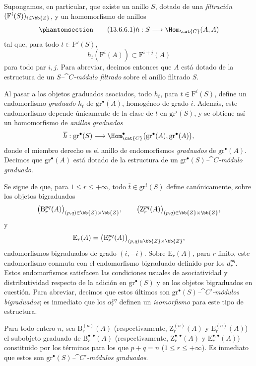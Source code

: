 \documentclass[oneside]{amsart}
\renewcommand{\leq}{\leqslant}
\newcommand{\oldpage}[2][]{{\marginnote{\normalfont\textbf{#1}~|~#2}}\ignorespaces}
\let\EGAOriginalLabel\label
\renewcommand{\label}[1]{\phantomsection\EGAOriginalLabel{#1}}
\begin{document}
\begin{env}[13.6.6]
\label{0.13.6.6}
Supongamos, en particular, que existe un anillo $S$, dotado de una
\emph{filtración} $(\mathrm{F}^i(S))_{i\in\bb{Z}}$, y un homomorfismo
de anillos
\begin{equation}
\label{0.13.6.6.1}
\tag{13.6.6.1}
  h:S\longrightarrow\Hom_{\cat{C}}(A,A)
\end{equation}
\oldpage[0\textsubscript{III}]{75}
tal que, para todo $t\in\mathrm{F}^j(S)$,
\[
  h_t(\mathrm F^i(A))
  \subset
  \mathrm{F}^{i+j}(A)
\]
para todo par $i,j$.
Para abreviar, decimos entonces que $A$ está dotado de la estructura de un
\emph{$S$--$\cat{C}$-módulo filtrado} sobre el anillo filtrado $S$.

Al pasar a los objetos graduados asociados, todo $h_t$, para
$t\in\mathrm{F}^i(S)$, define un endomorfismo \emph{graduado}
$\overline{h}_t$ de $\mathrm{gr}^\bullet(A)$, homogéneo de grado
$i$.
Además, este endomorfismo depende únicamente de la clase de $t$ en
$\mathrm{gr}^i(S)$, y se obtiene así un homomorfismo de
\emph{anillos graduados}
\[
  \overline{h}:
  \mathrm{gr}^\bullet(S)
  \longrightarrow
  \Hom_{\cat{C}}^\bullet
  \bigl(\mathrm{gr}^\bullet(A),\mathrm{gr}^\bullet(A)\bigr),
\]
donde el miembro derecho es el anillo de endomorfismos \emph{graduados} de
$\mathrm{gr}^\bullet(A)$.
Decimos que $\mathrm{gr}^\bullet(A)$ está dotado de la estructura
de un \emph{$\mathrm{gr}^\bullet(S)$--$\cat{C}$-módulo graduado}.

Se sigue de  que, para
$1\leq r\leq+\infty$, todo
$\overline{t}\in\mathrm{gr}^i(S)$ define canónicamente, sobre los
objetos bigraduados
\[
  \bigl(\mathrm{B}_r^{pq}(A)\bigr)_{(p,q)\in\bb{Z}\times\bb{Z}},
  \qquad
  \bigl(\mathrm{Z}_r^{pq}(A)\bigr)_{(p,q)\in\bb{Z}\times\bb{Z}},
\]
y
\[
  \mathrm{E}_r(A)
  =
  \bigl(\mathrm{E}_r^{pq}(A)\bigr)_{(p,q)\in\bb{Z}\times\bb{Z}},
\]
endomorfismos bigraduados de grado $(i,-i)$.
Sobre $\mathrm{E}_r(A)$, para $r$ finito, este endomorfismo conmuta con
el endomorfismo bigraduado definido por los $d_r^{pq}$.
Estos endomorfismos satisfacen las condiciones usuales de asociatividad y
distributividad respecto de la adición en
$\mathrm{gr}^\bullet(S)$ y en los objetos bigraduados en cuestión.
Para abreviar, decimos que estos últimos son
\emph{$\mathrm{gr}^\bullet(S)$--$\cat{C}'$-módulos bigraduados};
es inmediato que los $\alpha_r^{pq}$ definen un \emph{isomorfismo} para
este tipo de estructura.

Para todo entero $n$, sea $\mathrm{B}_r^{(n)}(A)$
(respectivamente, $\mathrm{Z}_r^{(n)}(A)$ y
$\mathrm{E}_r^{(n)}(A)$) el subobjeto graduado de
$\mathrm{B}_r^{\bullet,\bullet}(A)$
(respectivamente, $\mathrm{Z}_r^{\bullet,\bullet}(A)$ y
$\mathrm{E}_r^{\bullet,\bullet}(A)$) constituido por los términos para
los que $p+q=n$ ($1\leq r\leq+\infty$).
Es inmediato que estos son
\emph{$\mathrm{gr}^\bullet(S)$--$\cat{C}'$-módulos graduados}.


\end{env}
\end{document}
